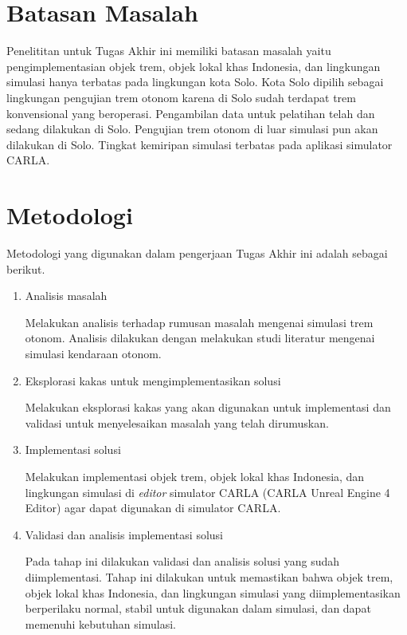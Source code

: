 \section{Batasan Masalah}

Penelititan untuk Tugas Akhir ini memiliki batasan masalah yaitu
pengimplementasian objek trem, objek lokal khas Indonesia, dan lingkungan
simulasi hanya terbatas pada lingkungan kota Solo. Kota Solo dipilih sebagai
lingkungan pengujian trem otonom karena di Solo sudah terdapat trem konvensional
yang beroperasi. Pengambilan data untuk pelatihan telah dan sedang dilakukan di
Solo. Pengujian trem otonom di luar simulasi pun akan dilakukan di Solo.
Tingkat kemiripan simulasi terbatas pada aplikasi simulator CARLA.

\section{Metodologi}

Metodologi yang digunakan dalam pengerjaan Tugas Akhir ini adalah sebagai
berikut.

\begin{enumerate}

    \item Analisis masalah

    Melakukan analisis terhadap rumusan masalah mengenai simulasi trem otonom.
    Analisis dilakukan dengan melakukan studi literatur mengenai simulasi
    kendaraan otonom.

    \item Eksplorasi kakas untuk mengimplementasikan solusi

    Melakukan eksplorasi kakas yang akan digunakan untuk implementasi dan
    validasi untuk menyelesaikan masalah yang telah dirumuskan.

    \item Implementasi solusi

    Melakukan implementasi objek trem, objek lokal khas Indonesia, dan
    lingkungan simulasi di \textit{editor} simulator CARLA (CARLA Unreal Engine
    4 Editor) agar dapat digunakan di simulator CARLA.

    \item Validasi dan analisis implementasi solusi

    Pada tahap ini dilakukan validasi dan analisis solusi yang sudah
    diimplementasi. Tahap ini dilakukan untuk memastikan bahwa objek trem, objek
    lokal khas Indonesia, dan lingkungan simulasi yang diimplementasikan
    berperilaku normal, stabil untuk digunakan dalam simulasi, dan dapat
    memenuhi kebutuhan simulasi.

\end{enumerate}

